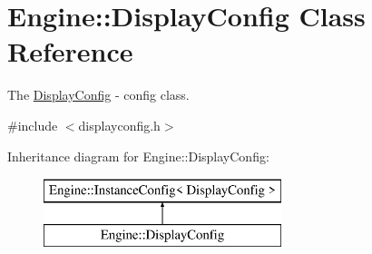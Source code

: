 \hypertarget{classEngine_1_1DisplayConfig}{}\section{Engine\+:\+:Display\+Config Class Reference}
\label{classEngine_1_1DisplayConfig}


The \hyperlink{classEngine_1_1DisplayConfig}{Display\+Config} -\/ config class.  




{\ttfamily \#include $<$displayconfig.\+h$>$}

Inheritance diagram for Engine\+:\+:Display\+Config\+:\begin{figure}[H]
\begin{center}
\leavevmode
\includegraphics[height=2.000000cm]{classEngine_1_1DisplayConfig}
\end{center}
\end{figure}
